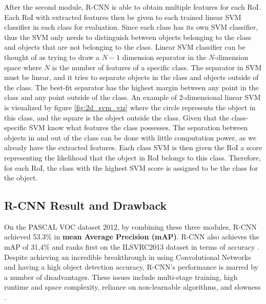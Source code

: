 After the second module, R-CNN is able to obtain multiple features for each RoI. Each RoI with extracted features then be given to each trained linear SVM classifier in each class for evaluation. Since each class has its own SVM classifier, thus the SVM only needs to distinguish between objects belonging to the class and objects that are not belonging to the class. Linear SVM classifier can be thought of as trying to draw a $N-1$ dimension separator in the $N$-dimension space where $N$ is the number of features of a specific class. The separator in SVM must be linear, and it tries to separate objects in the class and objects outside of the class. The best-fit separator has the highest margin between any point in the class and any point outside of the class. An example of 2-dimensional linear SVM is visualized by figure \ref{fig:2d_svm_viz} where the circle represents the object in this class, and the square is the object outside the class. Given that the class-specific SVM know what features the class possesses. The separation between objects in and out of the class can be done with little computation power, as we already have the extracted features. Each class SVM is then given the RoI a score representing the likelihood that the object in RoI belongs to this class. Therefore, for each RoI, the class with the highest SVM score is assigned to be the class for the object.

\subsection{R-CNN Result and Drawback}
On the PASCAL VOC dataset 2012, by combining these three modules, R-CNN achieved 53.3\% in \textbf{mean Average Precision (mAP)}. R-CNN also achieves the mAP of 31,4\% and ranks first on the ILSVRC2013 dataset in terms of accuracy \cite{Girshick_R_CNN_2013}. Despite achieving an incredible breakthrough in using Convolutional Networks and having a high object detection accuracy, R-CNN's performance is marred by a number of disadvantages. These issues include multi-stage training, high runtime and space complexity, reliance on non-learnable algorithms, and slowness \cite{fast_rcnn_og}. 

